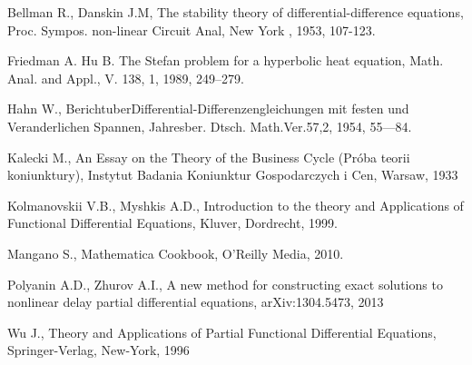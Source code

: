 \begin{thebibliography}{99}
Bellman R., Danskin J.M, The stability theory of differential-difference equations, Proc. Sympos. non-linear Circuit Anal, New York , 1953, 107-123.

Friedman A. Hu B. The Stefan problem for a hyperbolic heat equation, Math. Anal. and Appl., V. 138, 1, 1989, 249–279.

Hahn W., BerichtuberDifferential-Differenzengleichungen mit festen und Veranderlichen Spannen, Jahresber. Dtsch. Math.Ver.57,2, 1954, 55—84.

Kalecki M., An Essay on the Theory of the Business Cycle (Próba teorii koniunktury), Instytut Badania Koniunktur Gospodarczych i Cen, Warsaw, 1933

Kolmanovskii V.B., Myshkis A.D., Introduction to the theory and Applications of Functional Differential Equations, Kluver, Dordrecht, 1999.

Mangano S., Mathematica Cookbook, O'Reilly Media, 2010.

Polyanin A.D., Zhurov A.I., A new method for constructing exact solutions to nonlinear delay partial differential equations, arXiv:1304.5473, 2013

Wu J., Theory and Applications of Partial Functional Differential Equations, Springer-Verlag, New-York, 1996

\end{thebibliography}